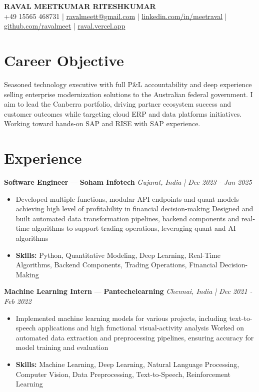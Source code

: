 \documentclass[a4paper,10pt]{article}
\begin{document}
\begin{center}
  {\Large\bfseries RAVAL MEETKUMAR RITESHKUMAR}\\[2pt]
  {\small +49 15565 468731 \;|\; \href{mailto:ravalmeett@gmail.com}{ravalmeett@gmail.com} \;|\; \href{https://www.linkedin.com/in/meetraval/}{linkedin.com/in/meetraval} \;|\; \href{https://github.com/ravalmeet}{github.com/ravalmeet} \;|\; \href{https://raval.vercel.app/}{raval.vercel.app}}
\end{center}
\vspace{-3pt}

\section*{Career Objective}
Seasoned technology executive with full P\&L accountability and deep experience selling enterprise modernization solutions to the Australian federal government. I aim to lead the Canberra portfolio, driving partner ecosystem success and customer outcomes while targeting cloud ERP and data platforms initiatives. Working toward hands-on SAP and RISE with SAP experience.\par

\section*{Experience}
\textbf{Software Engineer} — \textbf{Soham Infotech} \hfill \textit{Gujarat, India \;|\; Dec 2023 - Jan 2025}\par
\vspace{1pt}
\begin{itemize}
  \item Developed multiple functions, modular API endpoints and quant models achieving high level of profitability in financial decision-making Designed and built automated data transformation pipelines, backend components and real-time algorithms to support trading operations, leveraging quant and AI algorithms
  \item \textbf{Skills:} Python, Quantitative Modeling, Deep Learning, Real-Time Algorithms, Backend Components, Trading Operations, Financial Decision-Making
\end{itemize}
\vspace{3pt}
\textbf{Machine Learning Intern} — \textbf{Pantechelearning} \hfill \textit{Chennai, India \;|\; Dec 2021 - Feb 2022}\par
\vspace{1pt}
\begin{itemize}
  \item Implemented machine learning models for various projects, including text-to-speech applications and high functional visual-activity analysis Worked on automated data extraction and preprocessing pipelines, ensuring accuracy for model training and evaluation
  \item \textbf{Skills:} Machine Learning, Deep Learning, Natural Language Processing, Computer Vision, Data Preprocessing, Text-to-Speech, Reinforcement Learning
\end{itemize}
\end{document}
